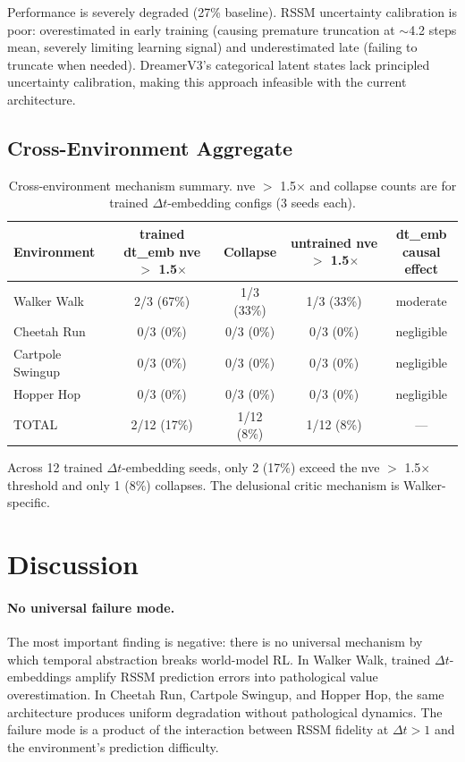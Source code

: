 \documentclass[10pt,letterpaper]{article}
\begin{document}
Performance is severely degraded (27\% baseline). RSSM uncertainty calibration is poor: overestimated in early training (causing premature truncation at $\sim$4.2 steps mean, severely limiting learning signal) and underestimated late (failing to truncate when needed). DreamerV3's categorical latent states lack principled uncertainty calibration, making this approach infeasible with the current architecture.

\subsection{Cross-Environment Aggregate}
\label{sec:aggregate}

\begin{table}[h]
\centering
\caption{Cross-environment mechanism summary. nve $>$ 1.5$\times$ and collapse counts are for trained $\Delta t$-embedding configs (3 seeds each).}
\label{tab:cross-env}
\begin{tabular}{lcccc}
\toprule
Environment & \makecell{trained dt\_emb \\ nve $>$ 1.5$\times$} & Collapse & \makecell{untrained \\ nve $>$ 1.5$\times$} & \makecell{dt\_emb \\ causal effect} \\
\midrule
Walker Walk & 2/3 (67\%) & 1/3 (33\%) & 1/3 (33\%) & moderate \\
Cheetah Run & 0/3 (0\%) & 0/3 (0\%) & 0/3 (0\%) & negligible \\
Cartpole Swingup & 0/3 (0\%) & 0/3 (0\%) & 0/3 (0\%) & negligible \\
Hopper Hop & 0/3 (0\%) & 0/3 (0\%) & 0/3 (0\%) & negligible \\
\midrule
TOTAL & 2/12 (17\%) & 1/12 (8\%) & 1/12 (8\%) & --- \\
\bottomrule
\end{tabular}
\end{table}

Across 12 trained $\Delta t$-embedding seeds, only 2 (17\%) exceed the nve $>$ 1.5$\times$ threshold and only 1 (8\%) collapses. The delusional critic mechanism is Walker-specific.

\section{Discussion}
\label{sec:discussion}

\paragraph{No universal failure mode.}
The most important finding is negative: there is no universal mechanism by which temporal abstraction breaks world-model RL. In Walker Walk, trained $\Delta t$-embeddings amplify RSSM prediction errors into pathological value overestimation. In Cheetah Run, Cartpole Swingup, and Hopper Hop, the same architecture produces uniform degradation without pathological dynamics. The failure mode is a product of the interaction between RSSM fidelity at $\Delta t{>}1$ and the environment's prediction difficulty.
\end{document}

